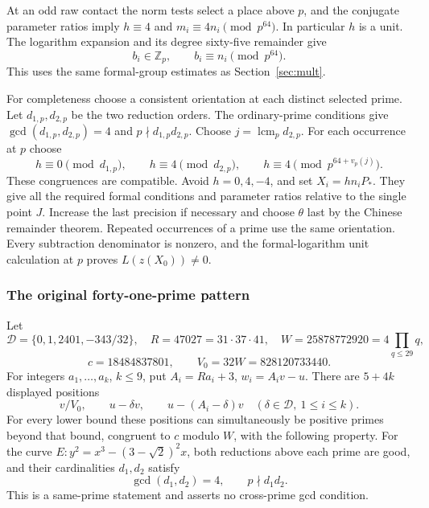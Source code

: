 \documentclass[11pt]{article}
\theoremstyle{definition}
\theoremstyle{remark}
\newcommand{\Z}{\mathbb Z}
\begin{document}
At an odd raw contact the norm tests select a place above $p$, and
the conjugate parameter ratios imply
$h\equiv4$ and $m_i\equiv4n_i\pmod {p^{64}}$.
In particular $h$ is a unit. The logarithm expansion and its degree
sixty-five remainder give
\begin{equation}\label{eq:o8-proxies}
 b_i\in\Z_p,\qquad b_i\equiv n_i\pmod {p^{64}}.
\end{equation}
This uses the same formal-group estimates as Section~\ref{sec:mult}.

For completeness choose a consistent orientation at each distinct
selected prime. Let $d_{1,p},d_{2,p}$ be the two reduction orders.
The ordinary-prime conditions give $\gcd(d_{1,p},d_{2,p})=4$ and
$p\nmid d_{1,p}d_{2,p}$. Choose
$j=\operatorname{lcm}_p d_{2,p}$. For each occurrence at $p$ choose
\[
 h\equiv0\pmod {d_{1,p}},\qquad
 h\equiv4\pmod {d_{2,p}},\qquad
 h\equiv4\pmod {p^{64+v_p(j)}}.
\]
These congruences are compatible. Avoid $h=0,4,-4$, and set
$X_i=hn_iP_*$. They give all the required formal conditions and
parameter ratios relative to the single point $J$. Increase the last
precision if necessary and choose $\theta$ last by the Chinese
remainder theorem. Repeated occurrences of a prime use the same
orientation. Every subtraction denominator is nonzero, and the
formal-logarithm unit calculation at $p$ proves $L(z(X_0))\ne0$.

\subsubsection{The original forty-one-prime pattern}\label{subsec:o8-pattern-proof}
Let
\[
 \mathcal D=\{0,1,2401,-343/32\},\quad R=47027=31\cdot37\cdot41,
 \quad W=25878772920=4\prod_{q\le29}q,
\]
\[
 c=18484837801,\qquad V_0=32W=828120733440.
\]
For integers $a_1,\ldots,a_k$, $k\le9$, put $A_i=Ra_i+3$,
$w_i=A_iv-u$. There are $5+4k$ displayed positions
\begin{equation}\label{eq:old41-list}
 v/V_0,\qquad u-\delta v,\qquad
 u-(A_i-\delta)v\quad(\delta\in\mathcal D,\ 1\le i\le k).
\end{equation}
For every lower bound these positions can simultaneously be positive
primes beyond that bound, congruent to $c$ modulo $W$, with the
following property. For the curve
$E:y^2=x^3-(3-\sqrt2)^2x$, both reductions above each prime are good,
and their cardinalities $d_1,d_2$ satisfy
\[
 \gcd(d_1,d_2)=4,\qquad p\nmid d_1d_2.
\]
This is a same-prime statement and asserts no cross-prime gcd condition.
\end{document}
